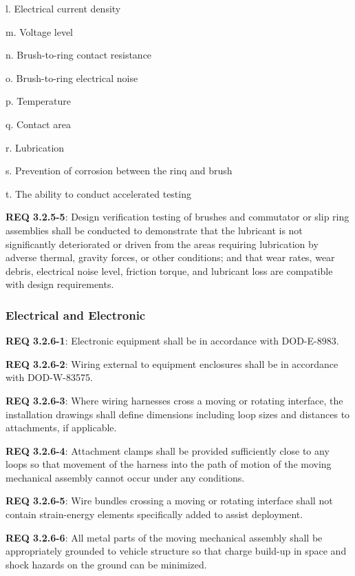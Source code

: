 \documentclass[12pt]{article}
\begin{document}
l. Electrical current density

m. Voltage level

n. Brush-to-ring contact resistance

o. Brush-to-ring electrical noise

p. Temperature

q. Contact area

r. Lubrication

s. Prevention of corrosion between the rinq and brush

t. The ability to conduct accelerated testing

\noindent \textbf{REQ 3.2.5-5}: Design verification testing of brushes and commutator or slip ring assemblies shall be conducted to demonstrate that the lubricant is not significantly deteriorated or driven from the areas requiring lubrication by adverse thermal, gravity forces, or other conditions; and that wear rates, wear debris, electrical noise level, friction torque, and lubricant loss are compatible with design requirements.


\subsubsection{Electrical and Electronic} %
\noindent \textbf{REQ 3.2.6-1}: Electronic equipment shall be in accordance with DOD-E-8983.

\noindent \textbf{REQ 3.2.6-2}: Wiring external to equipment enclosures shall be in accordance with DOD-W-83575.

\noindent \textbf{REQ 3.2.6-3}: Where wiring harnesses cross a moving or rotating interface, the installation drawings shall define dimensions including loop sizes and distances to attachments, if applicable. 

\noindent \textbf{REQ 3.2.6-4}: Attachment clamps shall be provided sufficiently close to any loops so that movement of the harness into the path of motion of the moving mechanical assembly cannot occur under any conditions. 

\noindent \textbf{REQ 3.2.6-5}: Wire bundles crossing a moving or rotating interface shall not contain strain-energy elements specifically added to assist deployment. 

\noindent \textbf{REQ 3.2.6-6}: All metal parts of the moving mechanical assembly shall be appropriately grounded to vehicle structure so that charge build-up in space and shock hazards on the ground can be minimized. 
\end{document}
